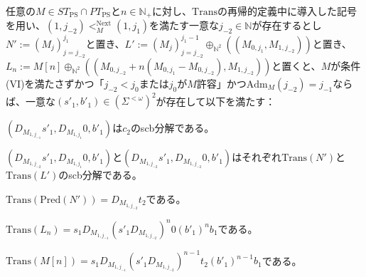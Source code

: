 \documentclass[dvipdfmx,uplatex]{jsarticle}
\theoremstyle{customnonumberbreakfortheorem}
\theoremstyle{customnonumberbreakforproof}
\begin{document}
\begin{lemma}\label{条件(III)～(V)の下での各種scb分解}
	任意の\(M \in ST_{\textrm{PS}} \cap PT_{\textrm{PS}}\)と\(n \in \mathbb{N}_{+}\)に対し、\(\textrm{Trans}\)の再帰的定義中に導入した記号を用い、\((1,j_{-2}) <_M^{\textrm{Next}} (1,j_1)\)を満たす一意な\(j_{-2} \in \mathbb{N}\)が存在するとし\(N' := (M_j)_{j=j_{-2}}^{j_1}\)と置き、\(L' := (M_j)_{j=j_{-2}}^{j_1-1} \oplus_{\mathbb{N}^2} ((M_{0,j_1},M_{1,j_{-2}}))\)と置き、\(L_n := M[n] \oplus_{\mathbb{N}^2} ((M_{0,j_{-2}}+n(M_{0,j_1}-M_{0,j_{-2}}),M_{1,j_{-2}}))\)と置くと\footnotemark{}、\(M\)が条件(VI)を満たさずかつ「\(j_{-2} < j_0\)または\(j_0\)が\(M\)許容」かつ\(\textrm{Adm}_M(j_{-2}) = j_{-1}\)ならば、一意な\((s'_1,b'_1) \in (\Sigma^{< \omega})^2\)が存在して以下を満たす：
	\begin{penumerate}
		\item \((D_{M_{1,j_{-1}}} s'_1,D_{M_{1,j_1}} 0,b'_1)\)は\(c_2\)のscb分解である。
		\item \((D_{M_{1,j_{-2}}} s'_1,D_{M_{1,j_1}} 0,b'_1)\)と\((D_{M_{1,j_{-2}}} s'_1,D_{M_{1,j_{-2}}} 0,b'_1)\)はそれぞれ\(\textrm{Trans}(N')\)と\(\textrm{Trans}(L')\)のscb分解である。
		\item \(\textrm{Trans}(\textrm{Pred}(N')) = D_{M_{1,j_{-2}}} t_2\)である。
		\item \(\textrm{Trans}(L_n) = s_1 D_{M_{1,j_{-1}}} (s'_1 D_{M_{1,j_{-2}}})^n 0 (b'_1)^n b_1\)である。
		\item \(\textrm{Trans}(M[n]) = s_1 D_{M_{1,j_{-1}}} (s'_1 D_{M_{1,j_{-2}}})^{n-1} t_2 (b'_1)^{n-1} b_1\)である。
	\end{penumerate}
\end{lemma}
\end{document}
